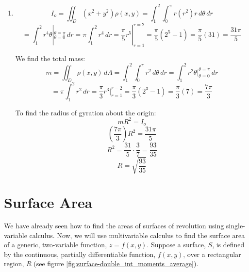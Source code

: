 \begin{Answer}[ref = moment]
\begin{enumerate}
We can then find the radius of gyration about the $y$-axis:
$$m \overline{\overline{x}}^2 = I_y$$
$$\pi \overline{\overline{x}}^2 = \frac{\pi^3}{12} - \frac{\pi}{2}$$
$$\overline{\overline{x}} = \sqrt{\frac{\pi^2}{12} - \frac{1}{2}}$$

\item $$I_o = \iint_{\textit{D}} \left( x^2 + y^2 \right) \rho(x, y) = \int_1^2
\int_0^{\pi} r (r^2) r \,d\theta \,dr$$
$$= \int_1^2 r^4 \theta|_{\theta = 0}^{\theta = \pi}\,dr = \pi \int_1^2 r^4\,dr
= \frac{\pi}{5} r^5|_{r = 1}^{r = 2} = \frac{\pi}{5} \left(2^5 - 1 \right) = 
\frac{\pi}{5} (31) = \frac{31\pi}{5}$$

We find the total mass:
$$m = \iint_{\textit{D}} \rho(x,y)\,dA = \int_1^2 \int_0^{\pi} r^2\,d\theta\,dr
= \int_1^2 r^2 \theta|_{\theta = 0}^{\theta = \pi}\,dr$$
$$= \pi \int_1^2 r^2\,dr = \frac{\pi}{3} r^3|_{r = 1}^{r = 2} = \frac{\pi}{3} 
\left(2^3 - 1 \right) = \frac{\pi}{3}(7) = \frac{7\pi}{3}$$

To find the radius of gyration about the origin:
$$mR^2 = I_o$$
$$\left( \frac{7\pi}{3} \right) R^2 = \frac{31\pi}{5}$$
$$R^2 = \frac{31}{5} \cdot \frac{3}{7} = \frac{93}{35}$$
$$R = \sqrt{
\frac{93}{35}}$$
\end{enumerate}
\end{Answer}

\section{Surface Area}
We have already seen how to find the areas of surfaces of revolution using 
single-variable calculus. Now, we will use multivariable calculus to find the 
surface area of a generic, two-variable function, $z = f(x, y)$. Suppose a 
surface, $S$, is defined by the continuous, partially differentiable function, 
$f(x, y)$, over a rectangular region, $R$ (see figure \ref{fig:surface-double_int_moments_average}). 

